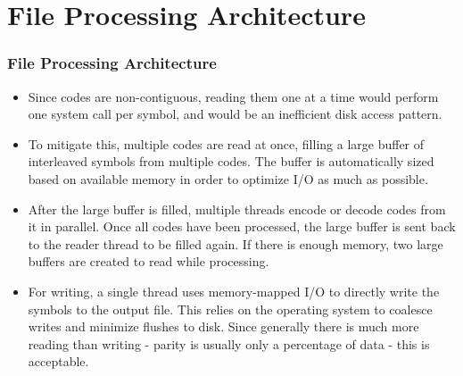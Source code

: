 \documentclass{beamer}
\begin{document}
\section{File Processing Architecture}
\begin{frame}
\frametitle{File Processing Architecture}
\begin{itemize}
\item
Since codes are non-contiguous, reading them one at a time would perform one system call per symbol, and would be an inefficient disk access pattern.

\item
To mitigate this, multiple codes are read at once, filling a large buffer of interleaved symbols from multiple codes.
The buffer is automatically sized based on available memory in order to optimize I/O as much as possible.

\item
After the large buffer is filled, multiple threads encode or decode codes from it in parallel.
Once all codes have been processed, the large buffer is sent back to the reader thread to be filled again.
If there is enough memory, two large buffers are created to read while processing.

\item
For writing, a single thread uses memory-mapped I/O to directly write the symbols to the output file.
This relies on the operating system to coalesce writes and minimize flushes to disk.
Since generally there is much more reading than writing - parity is usually only a percentage of data - this is acceptable.
\end{itemize}
\end{frame}
\end{document}
